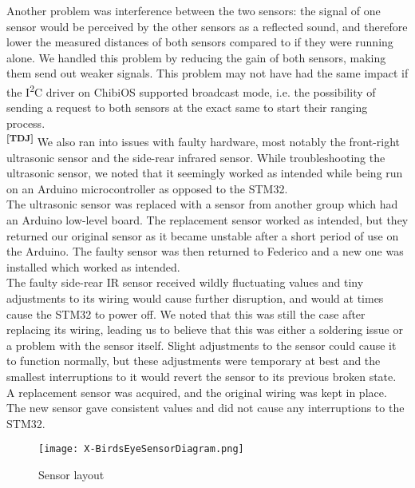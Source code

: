 \noindent
Another problem was interference between the two sensors: the signal of one
sensor would be perceived by the other sensors as a reflected sound, and
therefore lower the measured distances of both sensors compared to if they were
running alone. We handled this problem by reducing the gain of both sensors,
making them send out weaker signals. This problem may not have had the same
impact if the I\textsuperscript{2}C driver on ChibiOS supported broadcast mode,
i.e. the possibility of sending a request to both sensors at the exact same to
start their ranging process.\\

\noindent
\textsuperscript{\textbf{[TDJ]}}
We also ran into issues with faulty hardware, most notably the front-right
ultrasonic sensor and the side-rear infrared sensor. While troubleshooting the
ultrasonic sensor, we noted that it seemingly worked as intended while being run
on an Arduino microcontroller as opposed to the STM32.\\

\noindent
The ultrasonic sensor was replaced with a sensor from another group which had an
Arduino low-level board. The replacement sensor worked as intended, but they
returned our original sensor as it became unstable after a short period of use
on the Arduino. The faulty sensor was then returned to Federico and a new one
was installed which worked as intended.\\

\noindent
The faulty side-rear IR sensor received wildly fluctuating values and tiny
adjustments to its wiring would cause further disruption, and would at times
cause the STM32 to power off. We noted that this was still the case after
replacing its wiring, leading us to believe that this was either a soldering
issue or a problem with the sensor itself. Slight adjustments to the sensor
could cause it to function normally, but these adjustments were temporary at
best and the smallest interruptions to it would revert the sensor to its
previous broken state.\\

\noindent
A replacement sensor was acquired, and the original wiring was kept in place.
The new sensor gave consistent values and did not cause any interruptions to the
STM32.
\begin{figure}[ht]
  \centering
  \texttt{[image: X-BirdsEyeSensorDiagram.png]}
  \caption{Sensor layout}
  \label{sensorlay}
\end{figure}
